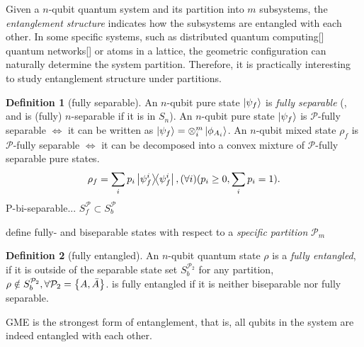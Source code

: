 \documentclass[
10pt,
aps,
pra,
linenumbers,
floatfix,
]{revtex4-2}
\theoremstyle{plain}
\theoremstyle{definition}
\newtheorem{definition}{Definition}
\newcommand{\separable}{S}
\newcommand{\ppartition}{\mathcal{P}}
\newcommand{\dm}{\rho}
\begin{document}
Given a $n$-qubit quantum system and its partition into $m$ subsystems, the \emph{entanglement structure} indicates how the subsystems are entangled with each other.
In some specific systems, such as distributed quantum computing[] quantum networks[] or atoms in a lattice, the geometric configuration can naturally determine the system partition.
Therefore, it is practically interesting to study entanglement structure under partitions.
\begin{definition}[fully separable]\label{def:fully_separable}
	An $n$-qubit pure state $\ket{\psi_f}$ is \emph{fully separable} \iff (, and is (fully) $n$-separable if it is in $S_n$).
	An $n$-qubit pure state $\ket{\psi_f}$ is $\ppartition$-fully separable $\iff$ it can be written as 
	$\ket{\psi_f}=\otimes_i^m \ket{\phi_{A_i}}$.
	An $n$-qubit mixed state $\dm_f$ is $\ppartition$-fully separable $\iff$ it can be decomposed into a convex mixture of $\ppartition$-fully separable pure states.
	\begin{equation}
		\dm_f = \sum_i p_i \op{\psi_f^i}, (\forall i) ( p_i\ge 0, \sum_i p_i = 1) .
	\end{equation}
	P-bi-separable... $\separable_f^\ppartition \subset S_b^\ppartition$
\end{definition}
define fully- and biseparable states with respect to a \emph{specific partition} $\ppartition_m$
\begin{definition}[fully entangled]\label{def:fully_entangled}
	An $n$-qubit quantum state $\dm$ is a \emph{fully entangled},
	if it is outside of the separable state set $S_b^{\ppartition_2}$ for any partition,
	$\dm \notin S_b^{\ppartition_2},\forall \ppartition_2 = \qty{A,\bar{A}}$.
	is fully entangled if it is neither biseparable nor fully separable.
\end{definition}
GME is the strongest form of entanglement, that is, 
all qubits in the system are indeed entangled with each other.
\end{document}
